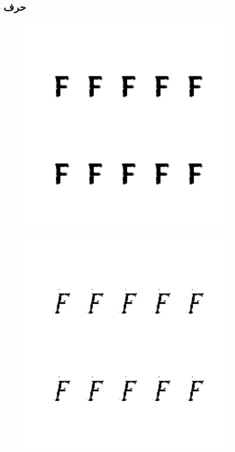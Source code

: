 \documentclass{article}
\begin{document}
\subsection{حرف }
\begin{figure}[H]
	\centerline{\includegraphics[width=\textwidth , height=\textheight ]{../results/CGAN_Adam/figs/letters/F/95.pdf}}
\end{figure}
\begin{figure}[H]
	\centerline{\includegraphics[width=\textwidth , height=\textheight ]{../results/CGAN_Adam/figs/letters/F/90.pdf}}
\end{figure}
\end{document}
